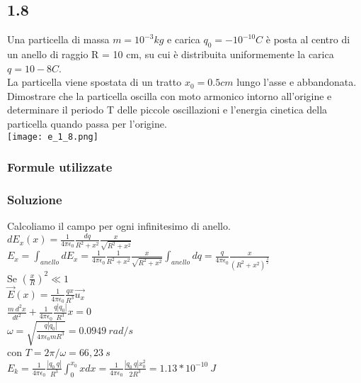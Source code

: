 \documentclass[../../main.tex]{subfiles}
\begin{document}
\subsection*{1.8}
Una particella di massa $m = 10^{-3}kg$ e carica $q_0 = -10^{-10} C$ è posta al centro di un anello di raggio R = 10 cm, su cui è distribuita uniformemente la carica $q = 10-8 C$.
\\La particella viene spostata di un tratto $x_0 = 0.5 cm$ lungo l’asse e abbandonata. 
\\Dimostrare che la particella oscilla con moto armonico intorno all’origine e determinare il periodo T delle piccole oscillazioni e l’energia cinetica della particella quando passa per l’origine.
\\\texttt{[image: e\_1\_8.png]}
\subsubsection*{Formule utilizzate}
\subsubsection*{Soluzione}
Calcoliamo il campo per ogni infinitesimo di anello.
\\$dE_x(x)=\frac{1}{4\pi\epsilon_0}\frac{dq}{R^2+x^2}\frac{x}{\sqrt{R^2 + x^2}}$
\\$E_x = \int_{anello}dE_x = \frac{1}{4\pi\epsilon_0}\frac{1}{R^2+x^2}\frac{x}{\sqrt{R^2+x^2}}\int_{anello}dq = \frac{q}{4\pi\epsilon_0}\frac{x}{(R^2 +x^2)^{\frac{3}{2}}}$
\\Se $\left(\frac{x}{R}\right)^2 \ll 1 $
\\$\vec{E}(x) = \frac{1}{4\pi\epsilon_0}\frac{qx}{R^3}\vec{u_x}$
\\$\frac{m\ d^2x}{dt^2}+\frac{1}{4\pi\epsilon_0}\frac{q|q_0|}{R^3}x = 0$
\\$\omega = \sqrt{\frac{q|q_0|}{4\pi\epsilon_0mR^3}} = 0.0949\ rad/s $
\\con $T = 2\pi / \omega = 66,23\ s$
\\$E_k = \frac{1}{4\pi\epsilon_0}\frac{|q_0\ q|}{R^3}\int_0^{x_0}xdx = \frac{1}{4\pi\epsilon_0}\frac{|q_0\ q| x_0^2}{2R^3}=1.13 * 10^{-10}\ J$
\newpage
\end{document}
